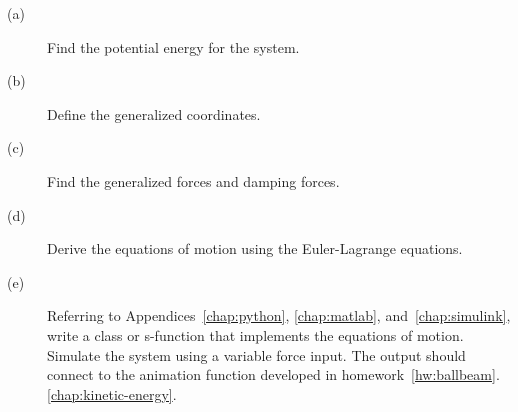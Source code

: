     \begin{description}
    \item[(a)] Find the potential energy for the system.
    \item[(b)] Define the generalized coordinates.
    \item[(c)] Find the generalized forces and damping forces.
    \item[(d)] Derive the equations of motion using the Euler-Lagrange equations.
    \item[(e)] Referring to Appendices~\ref{chap:python}, \ref{chap:matlab}, and~\ref{chap:simulink}, write a class or s-function that implements the equations of motion.  Simulate the system using a variable force input.  The output should connect to the animation function developed in homework~\ref{hw:ballbeam}.\ref{chap:kinetic-energy}.
    \end{description}

